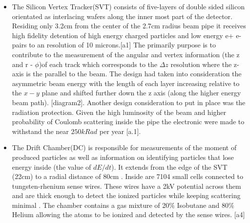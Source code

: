 \begin{itemize}
\item The Silicon Vertex Tracker(SVT) consists of five-layers of double sided silicon orientated as interlacing wafers along the inner most part of the detector. Residing only 3.2cm from the center of the 2.7cm radius beam pipe it receives  high fidelity detention of high energy charged particles and low energy e+ e- pairs to an resolution of 10 microns.[a1] The primarily purpose is to contribute to the measurement of the angular and vertex information (the z  and r - $\phi$)of each track which corresponds to the $\Delta z$ resolution where the z-axis is the parallel to the beam. The design had taken into consideration the asymmetric beam energy with the length of each layer increasing relative to the $x-y$ plane and shifted further down the z axis (along the higher energy beam path). [diagram2]. Another design consideration to put in place was the radiation protection. Given the high luminosity of the beam and higher probability of Coulomb scattering inside the pipe the electronic were made to withstand the near $250kRad$ per year [a.1].




\item The Drift Chamber(DC) is responsible for measurements of the moment of produced particles as well as information on identifying particles that lose energy inside (the value of $dE/dt$). It extends from the edge of the SVT (22cm) to a radial distance of 80cm . Inside are 7104 small cells connected to tungsten-rhenium sense wires. These wires have a 2kV potential across them and are thick enough to detect the ionized particles while keeping scattering minimal . The chamber contains a gas mixture of 20$\%$ Isobutane and 80$\%$ Helium allowing the atoms to be ionized and detected by the sense wires. [a4]





\end{itemize}
